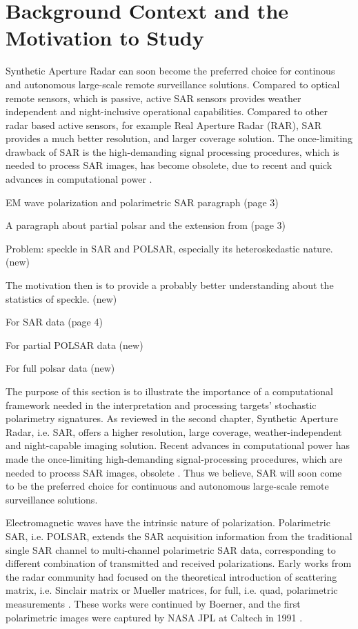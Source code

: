 	\section{Background Context and the Motivation to Study}

Synthetic Aperture Radar can soon become the preferred choice for
  continous and autonomous large-scale remote surveillance solutions.
Compared to optical remote sensors, which is passive,
  active SAR sensors provides weather independent and night-inclusive operational capabilities.
Compared to other radar based active sensors, for example Real Aperture Radar (RAR),
  SAR provides a much better resolution, and larger coverage solution.
The once-limiting drawback of SAR is the high-demanding signal processing procedures,
  which is needed to process SAR images, has become obsolete,
  due to recent and quick advances in computational power  \citep{Cumming_2005_Artech}.

EM wave polarization and polarimetric SAR paragraph (page 3)

A paragraph about partial polsar and the extension from (page 3)

Problem: speckle in SAR and POLSAR, especially its heteroskedastic nature. (new)

The motivation then is to provide a probably better understanding about the statistics of speckle. (new)

For SAR data (page 4)

For partial POLSAR data (new)

For full polsar data (new)

The purpose of this section is to illustrate the importance of a computational framework needed in the interpretation and processing targets' stochastic polarimetry signatures. 
As reviewed in the second chapter, Synthetic Aperture Radar, i.e. SAR, offers a higher resolution, large coverage, weather-independent and night-capable imaging solution.
Recent advances in computational power has made the once-limiting high-demanding signal-processing procedures, which are needed to process SAR images, obsolete \cite{Cumming_2005_Artech}.
Thus we believe, SAR will soon come to be the preferred choice for continuous and autonomous large-scale remote surveillance solutions.

Electromagnetic waves have the intrinsic nature of polarization.
Polarimetric SAR, i.e. POLSAR, extends the SAR acquisition information from the traditional single SAR channel to multi-channel polarimetric SAR data, corresponding to different combination of transmitted and received polarizations.
Early works from the radar community had focused on the theoretical introduction of scattering matrix, i.e. Sinclair matrix or Mueller matrices, for full, i.e. quad, polarimetric measurements \cite{Sinclair_1950_ProcsIRE}.
These works were continued by Boerner, and the first polarimetric images were captured by NASA JPL at Caltech in 1991 \cite{Zebker_1991_ProcsIEEE}.

